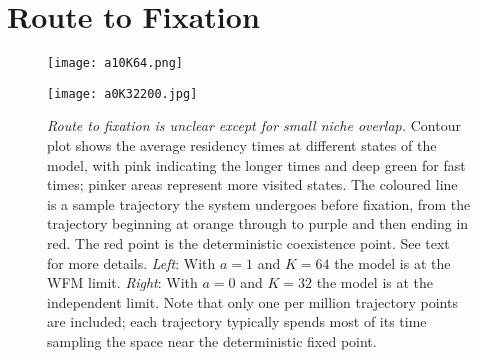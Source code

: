 \documentclass[a4paper,10pt]{article}
\numberwithin{equation}{section} %
\begin{document}
\section{Route to Fixation}
\begin{figure}[h]%
	\centering
	\begin{minipage}{0.49\linewidth}
			\texttt{[image: a10K64.png]}
	\end{minipage}
	\begin{minipage}{0.49\linewidth}
		\begin{flushright}
			\texttt{[image: a0K32200.jpg]} %
		\end{flushright}
	\end{minipage}
	\caption{\emph{Route to fixation is unclear except for small niche overlap.}  Contour plot shows the average residency times at different states of the model, with pink indicating the longer times and deep green for fast times; pinker areas represent more visited states. The coloured line is a sample trajectory the system undergoes before fixation, from the trajectory beginning at orange through to purple and then ending in red. The red point is the deterministic coexistence point. See text for more details. \emph{Left}: With $a=1$ and $K=64$ the model is at the WFM limit. \emph{Right}: With $a=0$ and $K=32$ the model is at the independent limit. Note that only one per million trajectory points are included; each trajectory typically spends most of its time sampling the space near the deterministic fixed point. } \label{extinctionroutes}%
\end{figure}
\end{document}
